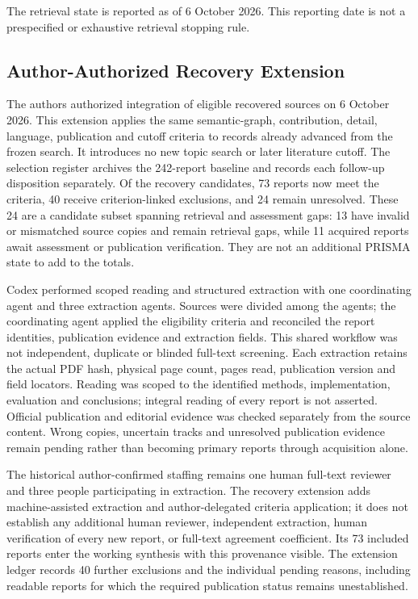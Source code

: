 \documentclass[manuscript,review,screen]{acmart}
\begin{document}
The retrieval state is reported as of 6 October 2026. This reporting date is not a prespecified or exhaustive retrieval stopping rule.


\subsection{Author-Authorized Recovery Extension}
\label{sec:recovery-extension}
The authors authorized integration of eligible recovered sources on 6 October 2026. This extension applies the same semantic-graph, contribution, detail, language, publication and cutoff criteria to records already advanced from the frozen search. It introduces no new topic search or later literature cutoff. The selection register archives the 242-report baseline and records each follow-up disposition separately. Of the recovery candidates, 73 reports now meet the criteria, 40 receive criterion-linked exclusions, and 24 remain unresolved. These 24 are a candidate subset spanning retrieval and assessment gaps: 13 have invalid or mismatched source copies and remain retrieval gaps, while 11 acquired reports await assessment or publication verification. They are not an additional PRISMA state to add to the totals.

Codex performed scoped reading and structured extraction with one coordinating agent and three extraction agents. Sources were divided among the agents; the coordinating agent applied the eligibility criteria and reconciled the report identities, publication evidence and extraction fields. This shared workflow was not independent, duplicate or blinded full-text screening. Each extraction retains the actual PDF hash, physical page count, pages read, publication version and field locators. Reading was scoped to the identified methods, implementation, evaluation and conclusions; integral reading of every report is not asserted. Official publication and editorial evidence was checked separately from the source content. Wrong copies, uncertain tracks and unresolved publication evidence remain pending rather than becoming primary reports through acquisition alone.

The historical author-confirmed staffing remains one human full-text reviewer and three people participating in extraction. The recovery extension adds machine-assisted extraction and author-delegated criteria application; it does not establish any additional human reviewer, independent extraction, human verification of every new report, or full-text agreement coefficient. Its 73 included reports enter the working synthesis with this provenance visible. The extension ledger records 40 further exclusions and the individual pending reasons, including readable reports for which the required publication status remains unestablished.
\end{document}
